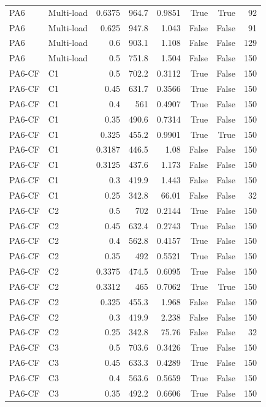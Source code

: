 \begin{table}[htbp]
\begin{tabular}{llrrrrrr}
PA6 & Multi-load & 0.6375 & 964.7 & 0.9851 & True & True & 92 \\
PA6 & Multi-load & 0.625 & 947.8 & 1.043 & False & False & 91 \\
PA6 & Multi-load & 0.6 & 903.1 & 1.108 & False & False & 129 \\
PA6 & Multi-load & 0.5 & 751.8 & 1.504 & False & False & 150 \\
PA6-CF & C1 & 0.5 & 702.2 & 0.3112 & True & False & 150 \\
PA6-CF & C1 & 0.45 & 631.7 & 0.3566 & True & False & 150 \\
PA6-CF & C1 & 0.4 & 561 & 0.4907 & True & False & 150 \\
PA6-CF & C1 & 0.35 & 490.6 & 0.7314 & True & False & 150 \\
PA6-CF & C1 & 0.325 & 455.2 & 0.9901 & True & True & 150 \\
PA6-CF & C1 & 0.3187 & 446.5 & 1.08 & False & False & 150 \\
PA6-CF & C1 & 0.3125 & 437.6 & 1.173 & False & False & 150 \\
PA6-CF & C1 & 0.3 & 419.9 & 1.443 & False & False & 150 \\
PA6-CF & C1 & 0.25 & 342.8 & 66.01 & False & False & 32 \\
PA6-CF & C2 & 0.5 & 702 & 0.2144 & True & False & 150 \\
PA6-CF & C2 & 0.45 & 632.4 & 0.2743 & True & False & 150 \\
PA6-CF & C2 & 0.4 & 562.8 & 0.4157 & True & False & 150 \\
PA6-CF & C2 & 0.35 & 492 & 0.5521 & True & False & 150 \\
PA6-CF & C2 & 0.3375 & 474.5 & 0.6095 & True & False & 150 \\
PA6-CF & C2 & 0.3312 & 465 & 0.7062 & True & True & 150 \\
PA6-CF & C2 & 0.325 & 455.3 & 1.968 & False & False & 150 \\
PA6-CF & C2 & 0.3 & 419.9 & 2.238 & False & False & 150 \\
PA6-CF & C2 & 0.25 & 342.8 & 75.76 & False & False & 32 \\
PA6-CF & C3 & 0.5 & 703.6 & 0.3426 & True & False & 150 \\
PA6-CF & C3 & 0.45 & 633.3 & 0.4289 & True & False & 150 \\
PA6-CF & C3 & 0.4 & 563.6 & 0.5659 & True & False & 150 \\
PA6-CF & C3 & 0.35 & 492.2 & 0.6606 & True & False & 150 \\

\end{tabular}
\end{table}
